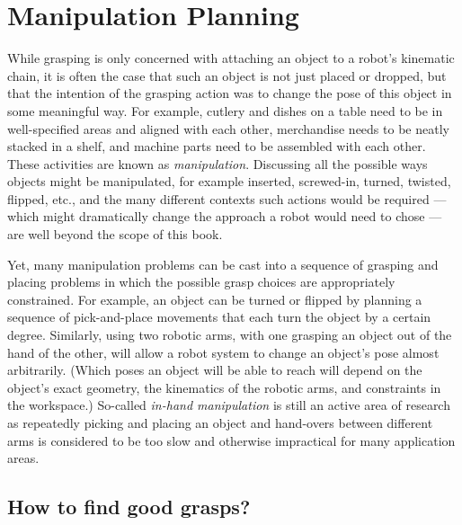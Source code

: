 \chapter{Manipulation Planning}\label{chap:manipulation}

While grasping is only concerned with attaching an object to a robot's kinematic chain, it is often the case that such an object is not just placed or dropped, but that the intention of the grasping action was to change the pose of this object in some meaningful way. For example, cutlery and dishes on a table need to be in well-specified areas and aligned with each other, merchandise needs to be neatly stacked in a shelf, and machine parts need to be assembled with each other. These activities are known as \textsl{manipulation}. Discussing all the possible ways objects might be manipulated, for example inserted, screwed-in, turned, twisted, flipped, etc., and the many different contexts such actions would be required --- which might dramatically change the approach a robot would need to chose --- are well beyond the scope of this book.

Yet, many manipulation problems can be cast into a sequence of grasping and placing problems in which the possible grasp choices are appropriately constrained. For example, an object can be turned or flipped by planning a sequence of pick-and-place movements that each turn the object by a certain degree. Similarly, using two robotic arms, with one grasping an object out of the hand of the other, will allow a robot system to change an object's pose almost arbitrarily. (Which poses an object will be able to reach will depend on the object's exact geometry, the kinematics of the robotic arms, and constraints in the workspace.) So-called \textsl{in-hand manipulation} is still an active area of research as  repeatedly picking and placing an object and hand-overs between different arms is considered to be too slow and otherwise impractical for many application areas.

\section{How to find good grasps?}

